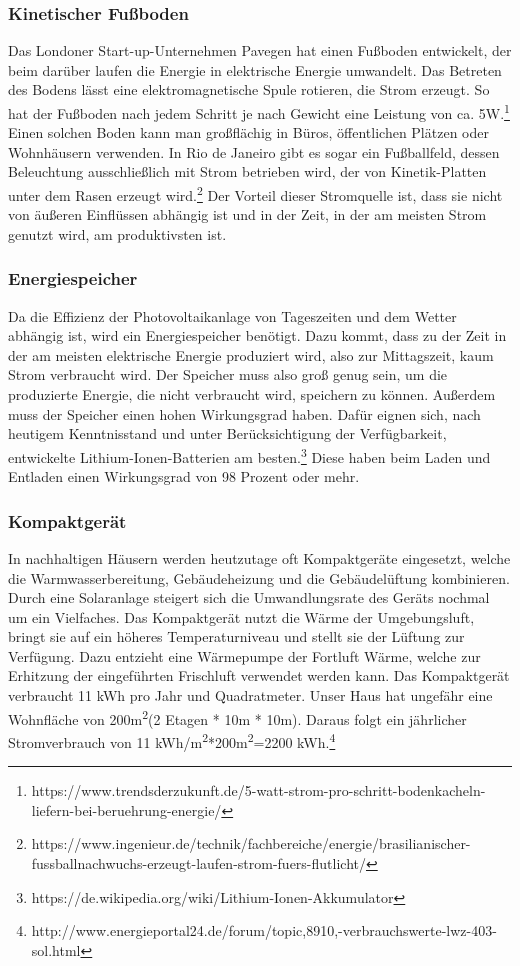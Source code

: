 \subsubsection{Kinetischer Fußboden}
Das Londoner Start-up-Unternehmen Pavegen hat einen Fußboden entwickelt, der beim
darüber laufen die Energie in elektrische Energie umwandelt. Das Betreten des Bodens lässt eine
elektromagnetische Spule rotieren, die Strom erzeugt. So hat der Fußboden nach jedem Schritt je
nach Gewicht eine Leistung von ca. 5W.\footnote{https://www.trendsderzukunft.de/5-watt-strom-pro-schritt-bodenkacheln-liefern-bei-beruehrung-energie/} Einen solchen Boden kann man
großflächig in Büros, öffentlichen Plätzen oder Wohnhäusern verwenden. In Rio de Janeiro gibt es
sogar ein Fußballfeld, dessen Beleuchtung ausschließlich mit Strom betrieben wird, der von
Kinetik-Platten unter dem Rasen erzeugt wird.\footnote{https://www.ingenieur.de/technik/fachbereiche/energie/brasilianischer-fussballnachwuchs-erzeugt-laufen-strom-fuers-flutlicht/} Der
Vorteil dieser Stromquelle ist, dass sie nicht von äußeren Einflüssen abhängig ist und in der Zeit,
in der am meisten Strom genutzt wird, am produktivsten ist.
\subsubsection{Energiespeicher}
Da die Effizienz der Photovoltaikanlage von Tageszeiten und dem Wetter abhängig ist, wird ein
Energiespeicher benötigt. Dazu kommt, dass zu der Zeit in der am meisten elektrische Energie
produziert wird, also zur Mittagszeit, kaum Strom verbraucht wird. Der Speicher muss also groß
genug sein, um die produzierte Energie, die nicht verbraucht wird, speichern zu können.
Außerdem muss der Speicher einen hohen Wirkungsgrad haben. Dafür eignen sich, nach heutigem Kenntnisstand und unter Berücksichtigung der Verfügbarkeit, entwickelte
Lithium-Ionen-Batterien am besten.\footnote{https://de.wikipedia.org/wiki/Lithium-Ionen-Akkumulator} Diese haben beim Laden und Entladen einen Wirkungsgrad von 98 Prozent oder
mehr.
\subsubsection{Kompaktgerät}
In nachhaltigen Häusern werden heutzutage oft Kompaktgeräte eingesetzt, welche die Warmwasserbereitung, Gebäudeheizung und die Gebäudelüftung kombinieren. Durch eine Solaranlage steigert sich die Umwandlungsrate des Geräts nochmal um ein Vielfaches. Das Kompaktgerät nutzt die Wärme der Umgebungsluft, bringt sie auf ein höheres Temperaturniveau und stellt sie der Lüftung zur Verfügung. Dazu entzieht eine Wärmepumpe der Fortluft Wärme, welche zur Erhitzung der eingeführten Frischluft verwendet werden kann. Das Kompaktgerät verbraucht 11 kWh pro Jahr und Quadratmeter. Unser Haus hat ungefähr eine Wohnfläche von 200m\textsuperscript{2}(2 Etagen * 10m * 10m). Daraus folgt ein jährlicher Stromverbrauch von 11 kWh/m\textsuperscript{2}*200m\textsuperscript{2}=2200 kWh.\footnote{http://www.energieportal24.de/forum/topic,8910,-verbrauchswerte-lwz-403-sol.html}
